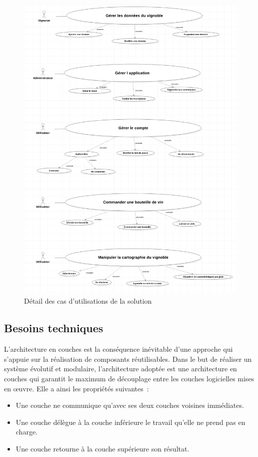\documentclass[a4paper, titlepage]{report}
\begin{document}
\begin{figure}[!ht]
\centering
\includegraphics{Images/UseCaseDiagramDetailSolution.png}
\caption{Détail des cas d'utilisations de la solution}
\end{figure}

\clearpage
\subsection{Besoins techniques}

L'architecture en couches est la conséquence inévitable d'une approche
qui s'appuie sur la réalisation de composants réutilisables. Dans le but
de réaliser un système évolutif et modulaire, l'architecture adoptée est
une architecture en couches qui garantit le maximum de découplage entre
les couches logicielles mises en œuvre. Elle a ainsi les propriétés
suivantes~: 
\begin{itemize}
\item Une couche ne communique qu'avec ses deux couches voisines immédiates. 
\item Une couche délègue à la couche inférieure le travail qu'elle ne prend pas en charge. 
\item Une couche retourne à la couche supérieure son résultat.
\end{itemize}
\end{document}
